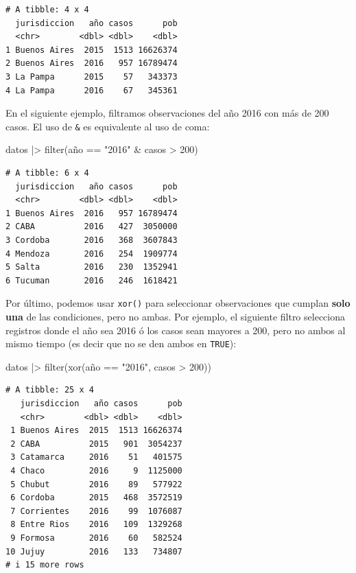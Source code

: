 \documentclass[
  spanish,
  a4paper,
]{scrbook}
\newenvironment{Shaded}{\begin{snugshade}}{\end{snugshade}}
\newcommand{\DecValTok}[1]{\textcolor[rgb]{0.68,0.00,0.00}{#1}}
\newcommand{\FunctionTok}[1]{\textcolor[rgb]{0.28,0.35,0.67}{#1}}
\newcommand{\NormalTok}[1]{\textcolor[rgb]{0.00,0.23,0.31}{#1}}
\newcommand{\SpecialCharTok}[1]{\textcolor[rgb]{0.37,0.37,0.37}{#1}}
\newcommand{\StringTok}[1]{\textcolor[rgb]{0.13,0.47,0.30}{#1}}
\begin{document}
\begin{verbatim}
# A tibble: 4 x 4
  jurisdiccion   año casos      pob
  <chr>        <dbl> <dbl>    <dbl>
1 Buenos Aires  2015  1513 16626374
2 Buenos Aires  2016   957 16789474
3 La Pampa      2015    57   343373
4 La Pampa      2016    67   345361
\end{verbatim}

En el siguiente ejemplo, filtramos observaciones del año 2016 con más de
200 casos. El uso de \texttt{\&} es equivalente al uso de coma:

\begin{Shaded}
\begin{Highlighting}[]
\NormalTok{datos }\SpecialCharTok{|\textgreater{}}
  \FunctionTok{filter}\NormalTok{(año }\SpecialCharTok{==} \StringTok{"2016"} \SpecialCharTok{\&}\NormalTok{ casos }\SpecialCharTok{\textgreater{}} \DecValTok{200}\NormalTok{)}
\end{Highlighting}
\end{Shaded}

\begin{verbatim}
# A tibble: 6 x 4
  jurisdiccion   año casos      pob
  <chr>        <dbl> <dbl>    <dbl>
1 Buenos Aires  2016   957 16789474
2 CABA          2016   427  3050000
3 Cordoba       2016   368  3607843
4 Mendoza       2016   254  1909774
5 Salta         2016   230  1352941
6 Tucuman       2016   246  1618421
\end{verbatim}

Por último, podemos usar \texttt{xor()} para seleccionar observaciones
que cumplan \textbf{solo una} de las condiciones, pero no ambas. Por
ejemplo, el siguiente filtro selecciona registros donde el año sea 2016
ó los casos sean mayores a 200, pero no ambos al mismo tiempo (es decir
que no se den ambos en \texttt{TRUE}):

\begin{Shaded}
\begin{Highlighting}[]
\NormalTok{datos }\SpecialCharTok{|\textgreater{}}
  \FunctionTok{filter}\NormalTok{(}\FunctionTok{xor}\NormalTok{(año }\SpecialCharTok{==} \StringTok{"2016"}\NormalTok{, casos }\SpecialCharTok{\textgreater{}} \DecValTok{200}\NormalTok{))}
\end{Highlighting}
\end{Shaded}

\begin{verbatim}
# A tibble: 25 x 4
   jurisdiccion   año casos      pob
   <chr>        <dbl> <dbl>    <dbl>
 1 Buenos Aires  2015  1513 16626374
 2 CABA          2015   901  3054237
 3 Catamarca     2016    51   401575
 4 Chaco         2016     9  1125000
 5 Chubut        2016    89   577922
 6 Cordoba       2015   468  3572519
 7 Corrientes    2016    99  1076087
 8 Entre Rios    2016   109  1329268
 9 Formosa       2016    60   582524
10 Jujuy         2016   133   734807
# i 15 more rows
\end{verbatim}
\end{document}
